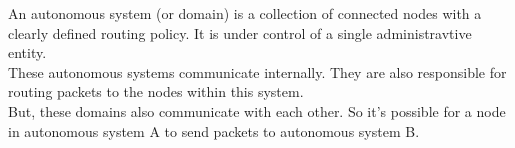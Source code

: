 An autonomous system (or domain) is a collection of connected nodes with a clearly defined routing policy. It is under control of a single administravtive entity. \\
These autonomous systems communicate internally. They are also responsible for routing packets to the nodes within this system. \\
But, these domains also communicate with each other. So it's possible for a node in autonomous system A to send packets to autonomous system B.